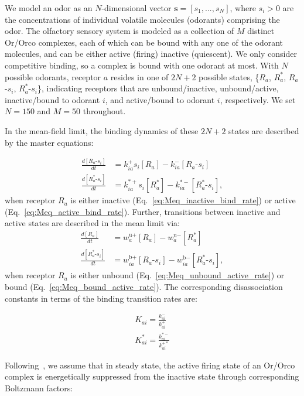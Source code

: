 \documentclass[9pt,twocolumn,twoside,lineno]{pnas-new}
\begin{document}
We model an odor as an $N$-dimensional vector ${\mathbf s=[ s_1,...,s_N]}$, where $s_i > 0$ are the concentrations of individual volatile molecules (odorants) comprising the odor. 
The olfactory sensory system is modeled as a collection of $M$ distinct Or/Orco complexes, each of which can be bound with any one of the odorant molecules, and can be either active (firing) inactive (quiescent). We only consider competitive binding, so a complex is bound with one odorant at most. With $N$ possible odorants, receptor $a$ resides in one of $2N+2$ possible states, \{$R_a$, $R^*_a$, $R_a$-$s_i$, $R^*_a$-$s_i$\}, indicating receptors that are unbound/inactive, unbound/active, inactive/bound to odorant $i$, and active/bound to odorant $i$, respectively. We set $N = 150$ and $M = 50$ throughout.

In the mean-field limit, the binding dynamics of these $2N + 2$ states are described by the master equations:

\begin{align}
\frac{d[R_a\text{-}s_i]}{dt} &= k^+_{ia}s_i[R_a] - k^-_{ia}[R_a\text{-}s_i] \label{eq:Meq_inactive_bind_rate}\\
\frac{d[R^*_a\text{-}s_i]}{dt} &= k^{*+}_{ia}s_i[R^*_a] - k^{*-}_{ia}[R^*_a\text{-}s_i],
\label{eq:Meq_active_bind_rate}
\end{align}
when receptor $R_a$ is either inactive (Eq.~\ref{eq:Meq_inactive_bind_rate}) or active (Eq.~\ref{eq:Meq_active_bind_rate}). Further, transitions between inactive and active states are described in the mean limit via:
\begin{align}
\frac{d[R_a]}{dt} &= w^{\text{u}+}_a [R_a] - w^{\text{u}-}_a [R^*_a] \label{eq:Meq_unbound_active_rate}\\
\frac{d[R^*_a\text{-}s_i]}{dt} &=  w^{\text{b}+}_{ia} [R_a\text{-}s_i] - w^{\text{b}-}_{ia}  [R^*_a\text{-}s_i],
\label{eq:Meq_bound_active_rate}
\end{align}
when receptor $R_a$ is either unbound (Eq.~\ref{eq:Meq_unbound_active_rate}) or bound (Eq.~\ref{eq:Meq_bound_active_rate}). The corresponding disassociation constants in terms of the binding transition rates are:


\begin{align}
K_{ai} = \frac{k^-_{ai}}{k^+_{ai}} \nonumber \\
K^*_{ai} = \frac{k^{*-}_{ai}}{k^{+*}_{ai}} 
\label{eq:Kd}
\end{align}

Following~\cite{srinivas_elife}, we assume that in steady state, the active firing state of an Or/Orco complex is energetically suppressed from the inactive state through corresponding Boltzmann factors:
\end{document}
